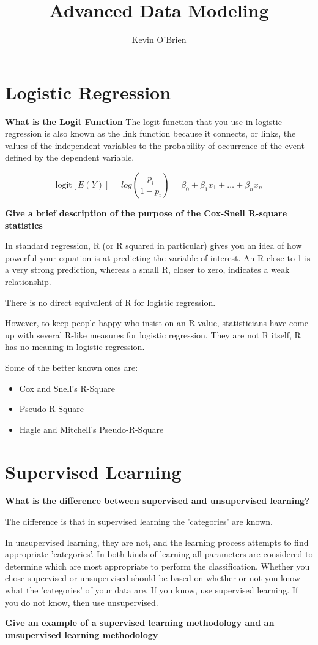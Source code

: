 \documentclass[12pt]{article} %
\title{Advanced Data Modeling}
\author{Kevin O'Brien}
\begin{document}
\maketitle
\tableofcontents

\newpage
\section{Logistic Regression}
\textbf{What is the Logit Function}
The logit function that you use in logistic regression is also known as the link function because it connects, or links, the values of the independent variables to the probability of occurrence of the event defined by the dependent variable.

\[ \mbox{logit}[E(Y)] = log(\frac{p_i}{1-p_i}) = \beta_0 + \beta_1x_1 + \ldots + \beta_nx_n \]


\textbf{Give a brief description of the purpose of the Cox-Snell R-square statistics}

In standard regression, R (or R squared in particular) gives you an idea of how powerful your equation is at predicting the variable of interest. An R close to 1 is a very strong prediction, whereas a small R, closer to zero, indicates a weak relationship.

There is no direct equivalent of R for logistic regression.

However, to keep people happy who insist on an R value, statisticians have come up with several R-like measures for logistic regression. They are not R itself, R has no meaning in logistic regression.

Some of the better known ones are:

\begin{itemize}
\item Cox and Snell's R-Square
\item Pseudo-R-Square
\item Hagle and Mitchell's Pseudo-R-Square
\end{itemize}
\section{Supervised Learning}


\textbf{What is the difference between supervised and unsupervised learning?}

The difference is that in supervised learning the 'categories' are known.

In unsupervised learning, they are not, and the learning process attempts to find appropriate 'categories'. In both kinds of learning all parameters are considered to determine which are most appropriate to perform the classification.
Whether you chose supervised or unsupervised should be based on whether or not you know what the
'categories' of your data are. If you know, use supervised learning. If you do not know, then use
unsupervised.


\textbf{Give an example of a supervised learning methodology and an unsupervised learning methodology}
\end{document}

